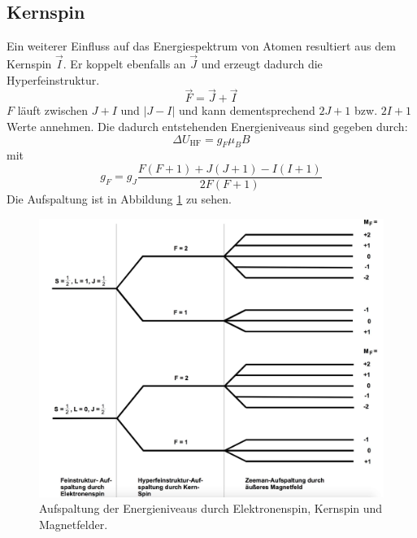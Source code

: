 \subsection{Kernspin}
Ein weiterer Einfluss auf das Energiespektrum von Atomen resultiert aus dem Kernspin $\vec{I}$. Er koppelt ebenfalls an $\vec{J}$ und erzeugt dadurch die Hyperfeinstruktur.
\begin{equation}
	\vec{F}=\vec{J} +\vec{I}
\end{equation}
$F$ läuft zwischen $J+I$ und $|J-I|$ und kann dementsprechend $2J+1$ bzw. $2I+1$ Werte annehmen. Die dadurch entstehenden Energieniveaus sind gegeben durch:
\begin{equation}
	\Delta U_\text{HF}=g_F\mu_BB
	\label{eqn:Zeeman}
\end{equation}
mit
\begin{equation}
	g_F=g_J\frac{F(F+1)+J(J+1)-I(I+1)}{2F(F+1)}
	\label{eqn:g_F}
\end{equation}
Die Aufspaltung ist in Abbildung \ref{fig:Zeeman} zu sehen.
\begin{figure}
	\centering
	\includegraphics[width=0.8\linewidth]{img/zeemann.jpg}
	\caption{Aufspaltung der Energieniveaus durch Elektronenspin, Kernspin und Magnetfelder.\cite{V21}}
	\label{fig:Zeeman}
\end{figure}
